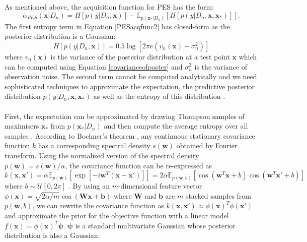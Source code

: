 \documentclass[a4paper,11pt]{report}
\begin{document}
As mentioned above, the acquisition function for PES has the form: 
\begin{equation} \label{PESacqfunc2}
\alpha_{PES} (\mathbf{x} \vert D_n )=H[p(y \vert D_n,\mathbf{x})]-\mathbb{E} _{p(\mathbf{x}_{*} \vert D_n)}[H[p(y \vert D_n,\mathbf{x},\mathbf{x}_{*})]].
\end{equation}
The first entropy term in Equation \ref{PESacqfunc2} has closed-form as the posterior distribution is a Gaussian:  
\begin{equation}
 H[p(y \vert D_n,\mathbf{x})] = 0.5 \log [2 \pi e ( v_n (\mathbf{x}) + \sigma_n^2)]
 \end{equation}
 where $v_n (\mathbf{x})$ is the variance of the posterior distribution at a test point $\mathbf{x}$ which can be computed using Equation \ref{covarianceofposter} and $\sigma_n^2$ is the variance of observation noise.  The second term cannot be computed analytically and we need sophisticated techniques to approximate the expectation, the predictive posterior distribution $p(y \vert D_n,\mathbf{x},\mathbf{x}_{*})$ as well as the entropy of this distribution \cite{hernandez2014predictive}. 
\\\\
First, the expectation can be approximated by drawing Thompson samples of maximisers $\mathbf{x}_{*} $ from $p(\mathbf{x}_{*} \vert D_n)$ and then compute the average entropy over all samples \cite{hernandez2014predictive}. According to Bochner's theorem \cite{bochner2016lectures}, any continuous stationary covariance function $k$ has a corresponding spectral density $s(\mathbf{w})$ obtained by Fourier transform. Using the normalised version of the spectral density $p(\mathbf{w})=s(\mathbf{w}) /\alpha$, the covariance function can be re-expressed as 
\begin{equation}
	k(\mathbf{x},\mathbf{x}') = \alpha \mathbb{E}_{p(\mathbf{w})} \left[ \exp [ - i \mathbf{w}^ {T} (\mathbf{x} - \mathbf{x}') ] \right] = 2 \alpha \mathbb{E}_{p(\mathbf{w}, b)} \left[ \cos(\mathbf{w}^ {T} \mathbf{x} + b) \cos(\mathbf{w}^ {T} \mathbf{x}' + b) \right]
\end{equation}
\noindent where $ b \sim \mathcal{U} [0, 2 \pi] $ \cite{rahimi2007random}. By using an $m$-dimensional feature vector $\phi(\mathbf{x}) = \sqrt{2 \alpha /m } \cos(\mathbf{W} \mathbf{x} + \mathbf{b})$ where $\mathbf{W} $ and $\mathbf{b} $ are $m$ stacked samples from $p(\mathbf{w},b)$, we can rewrite the covariance function as $ k(\mathbf{x},\mathbf{x}')  \approx \phi(\mathbf{x}) ^T  \phi(\mathbf{x}') $ and approximate the prior for the objective function with a linear model $ f(\mathbf{x}) = \phi(\mathbf{x}) ^T \boldsymbol{\psi} $\cite{hernandez2014predictive}. $\boldsymbol{\psi} $ is a standard multivariate Gaussian whose posterior distribution is also a Gaussian:
\end{document}
